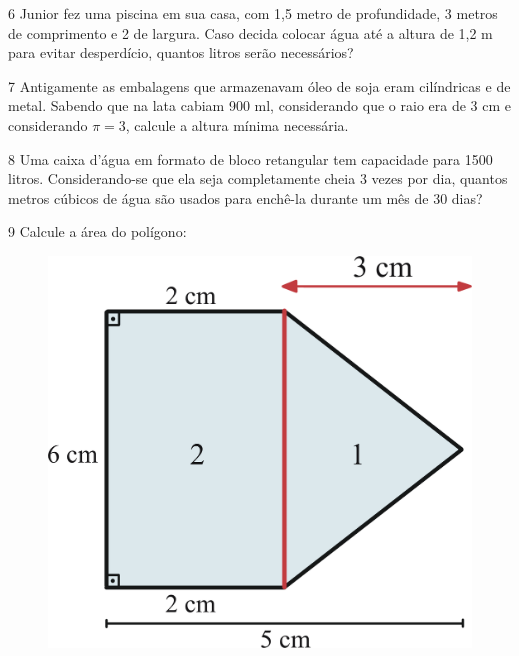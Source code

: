 \begin{emptybox}
\end{emptybox}

\num{6} Junior fez uma piscina em sua casa, com 1,5 metro
de profundidade, 3 metros de comprimento e 2 de largura. Caso decida
colocar água até a altura de 1,2 m para evitar desperdício,
quantos litros serão necessários?

\begin{emptybox}
\end{emptybox}

\pagebreak
\num{7} Antigamente as embalagens que armazenavam óleo de soja eram
cilíndricas e de metal. Sabendo que na lata cabiam 900 ml, considerando
que o raio era de 3 cm e considerando $\pi = 3$, calcule a altura
mínima necessária.

\begin{emptybox}
\end{emptybox}

\num{8} Uma caixa d'água em formato de bloco retangular tem
capacidade para 1500 litros. Considerando-se que ela seja completamente
cheia 3 vezes por dia, quantos metros cúbicos de água são usados para
enchê-la durante um mês de 30 dias?

\begin{emptybox}

\end{emptybox}

\num{9} Calcule a área do polígono:

\begin{figure}[htpb!]
\centering
\includegraphics[width=.35\textwidth]{./ilustras-mat/modulo_14-atividade_9_resposta.png}
\end{figure}

